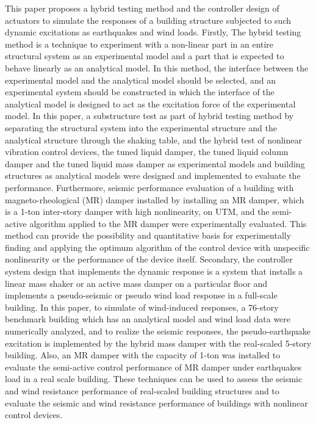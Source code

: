 This paper proposes a hybrid testing method and the controller design of actuators to simulate the responses of a building structure subjected to such dynamic excitations as earthquakes and wind loads. Firstly, The hybrid testing method is a technique to experiment with a non-linear part in an entire structural system as an experimental model and a part that is expected to behave linearly as an analytical model. In this method, the interface between the experimental model and the analytical model should be selected, and an experimental system should be constructed in which the interface of the analytical model is designed to act as the excitation force of the experimental model. In this paper, a substructure test as part of hybrid testing method by separating the structural system into the experimental structure and the analytical structure through the shaking table, and the hybrid test of nonlinear vibration control devices, the tuned liquid damper, the tuned liquid column damper and the tuned liquid mass damper as experimental models and building structures as analytical models were designed and implemented to evaluate the performance. Furthermore, seismic performance evaluation of a building with magneto-rheological (MR) damper installed by installing an MR damper, which is a 1-ton inter-story damper with high nonlinearity, on UTM, and the semi-active algorithm applied to the MR damper were experimentally evaluated. This method can provide the possibility and quantitative basis for experimentally finding and applying the optimum algorithm of the control device with unspecific nonlinearity or the performance of the device itself. Secondary, the controller system design that implements the dynamic response is a system that installs a linear mass shaker or an active mass damper on a particular floor and implements a pseudo-seismic or pseudo wind load response in a full-scale building. In this paper, to simulate of wind-induced responses, a 76-story benchmark building which has an analytical model and wind load data were numerically analyzed, and to realize the seismic responses, the pseudo-earthquake excitation is implemented by the hybrid mass damper with the real-scaled 5-story building. Also, an MR damper with the capacity of 1-ton was installed to evaluate the semi-active control performance of MR damper under earthquakes load in a real scale building. These techniques can be used to assess the seismic and wind resistance performance of real-scaled building structures and to evaluate the seismic and wind resistance performance of buildings with nonlinear control devices.

